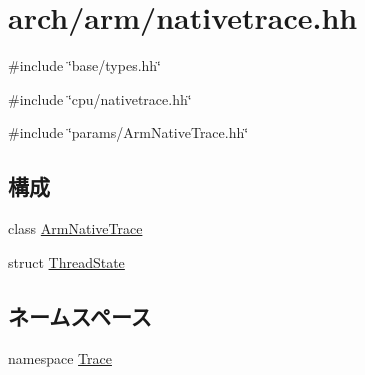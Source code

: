 \hypertarget{arch_2arm_2nativetrace_8hh}{
\section{arch/arm/nativetrace.hh}
\label{arch_2arm_2nativetrace_8hh}
}
{\ttfamily \#include \char`\"{}base/types.hh\char`\"{}}\par
{\ttfamily \#include \char`\"{}cpu/nativetrace.hh\char`\"{}}\par
{\ttfamily \#include \char`\"{}params/ArmNativeTrace.hh\char`\"{}}\par
\subsection*{構成}
\begin{DoxyCompactItemize}
\item 
class \hyperlink{classTrace_1_1ArmNativeTrace}{ArmNativeTrace}
\item 
struct \hyperlink{structTrace_1_1ArmNativeTrace_1_1ThreadState}{ThreadState}
\end{DoxyCompactItemize}
\subsection*{ネームスペース}
\begin{DoxyCompactItemize}
\item 
namespace \hyperlink{namespaceTrace}{Trace}
\end{DoxyCompactItemize}
